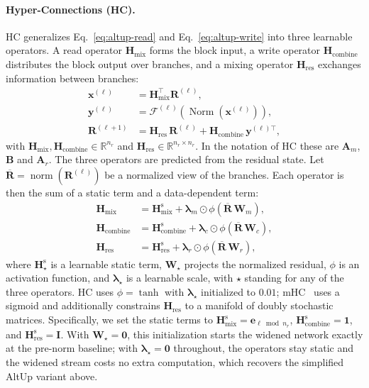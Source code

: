 \paragraph{Hyper-Connections (HC).}
\label{sec:residual-hc}
HC generalizes Eq.~\eqref{eq:altup-read} and Eq.~\eqref{eq:altup-write} into three learnable operators.
A read operator $\bm{H}_{\mathrm{mix}}$ forms the block input, a write operator $\bm{H}_{\mathrm{combine}}$ distributes the block output over branches, and a mixing operator $\bm{H}_{\mathrm{res}}$ exchanges information between branches:
\begin{align}
\bm{x}^{(\ell)} &= \bm{H}_{\mathrm{mix}}^{\top}\bm{R}^{(\ell)}, \label{eq:hc-mix}\\
\bm{y}^{(\ell)} &= \mathcal{F}^{(\ell)}\left(\operatorname{Norm}\left(\bm{x}^{(\ell)}\right)\right), \label{eq:hc-block}\\
\bm{R}^{(\ell+1)} &= \bm{H}_{\mathrm{res}}\,\bm{R}^{(\ell)}
   + \bm{H}_{\mathrm{combine}}\,\bm{y}^{(\ell)\top}, \label{eq:hc-combine}
\end{align}
with $\bm{H}_{\mathrm{mix}},\bm{H}_{\mathrm{combine}}\in\mathbb{R}^{n_r}$ and $\bm{H}_{\mathrm{res}}\in\mathbb{R}^{n_r\times n_r}$. In the notation of HC these are $\bm{A}_m$, $\bm{B}$ and $\bm{A}_r$.
The three operators are predicted from the residual state. Let $\overline{\bm{R}}=\operatorname{norm}(\bm{R}^{(\ell)})$ be a normalized view of the branches. Each operator is then the sum of a static term and a data-dependent term:
\begin{align}
\bm{H}_{\mathrm{mix}} &= \bm{H}^{\mathrm{s}}_{\mathrm{mix}}
   + \bm{\lambda}_{m}\odot\phi\left(\overline{\bm{R}}\,\bm{W}_{m}\right),
   \label{eq:hc-param-mix}\\
\bm{H}_{\mathrm{combine}} &= \bm{H}^{\mathrm{s}}_{\mathrm{combine}}
   + \bm{\lambda}_{c}\odot\phi\left(\overline{\bm{R}}\,\bm{W}_{c}\right),
   \label{eq:hc-param-combine}\\
\bm{H}_{\mathrm{res}} &= \bm{H}^{\mathrm{s}}_{\mathrm{res}}
   + \bm{\lambda}_{r}\odot\phi\left(\overline{\bm{R}}\,\bm{W}_{r}\right),
   \label{eq:hc-param-res}
\end{align}
where $\bm{H}^{\mathrm{s}}_{\star}$ is a learnable static term, $\bm{W}_{\star}$ projects the normalized residual, $\phi$ is an activation function, and $\bm{\lambda}_{\star}$ is a learnable scale, with $\star$ standing for any of the three operators. HC uses $\phi=\tanh$ with $\bm{\lambda}_{\star}$ initialized to $0.01$; mHC~\citep{xie2025mhc} uses a sigmoid and additionally constrains $\bm{H}_{\mathrm{res}}$ to a manifold of doubly stochastic matrices.
Specifically, we set the static terms to $\bm{H}^{\mathrm{s}}_{\mathrm{mix}} = \bm{e}_{\ell\bmod n_r}$, $\bm{H}^{\mathrm{s}}_{\mathrm{combine}} = \bm{1}$, and $\bm{H}^{\mathrm{s}}_{\mathrm{res}} = \bm{I}$. With $\bm{W}_{\star}=\bm{0}$, this initialization starts the widened network exactly at the pre-norm baseline; with $\bm{\lambda}_{\star}=\bm{0}$ throughout, the operators stay static and the widened stream costs no extra computation, which recovers the simplified AltUp variant above.

